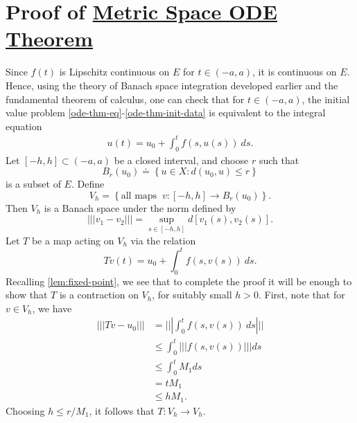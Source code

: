 \documentclass[12pt,reqno]{amsart}
\numberwithin{equation}{section}  %
\numberwithin{figure}{section}
\theoremstyle{plain}
\theoremstyle{definition}
\theoremstyle{remark}
\begin{document}
\section{Proof of \hyperref[ode-thm]{Metric Space ODE Theorem}}
	Since $f(t)$ is Lipschitz continuous on $E$ for $t \in (-a, a)$, it is
	continuous on $E$. Hence, using the theory of Banach space integration
  developed earlier and the fundamental theorem of calculus,
  one can check that for $t \in (-a, a)$, the initial value problem
  \eqref{ode-thm-eq}-\eqref{ode-thm-init-data} is equivalent to the
	integral equation
	\begin{equation*}
		\begin{split}
			u(t) = u_0 + \int_0^t f(s, u(s) ) \ ds.
		\end{split}
	\end{equation*}
	Let $[-h, h] \subset (-a, a)$ be a closed interval,
	and choose $r$ such that
	$$B_r(u_0) \doteq \left\{ u \in X: d(u_0, u) \le r \right\}$$
	is a subset of $E$. Define 
	$$V_h = \left\{ \text{all maps} \; \;  v: [-h, h]
		\to B_r(u_0)\right\}.$$ Then $V_h$ is a Banach
		space under the norm defined by $$| | | v_1 - v_2 | | | = \sup_{s \in [-h,
    h]} d[v_1(s),v_2(s)].$$ Let $T$ be a map
	acting on $V_h$ via the relation $$Tv(t) = u_0 + \int_0^t f(s, v(s) ) \ ds.$$
	Recalling \autoref{lem:fixed-point}, we see that to complete the proof it will be enough to show that $T$ is a contraction on
	$V_h$, for suitably small $h >0$. First, note that for $v \in V_h$, we have
\begin{equation}
	\label{cont-map-into}
	\begin{split}
		| | | Tv - u_0| | |
		& = | | | \int_0^t f(s, v(s) ) \ ds | | |
		\\
		& \le  \int_0^t | | | f(s, v(s) ) | | | ds
		\\
		& \le   \int_0^t M_1 ds
		\\
		& =  t M_1
		\\
		& \le  h M_1.
	\end{split}
\end{equation}
%
%
Choosing $h \le r/M_1$, it follows that $T: V_h \to V_h$. 
\end{document}
